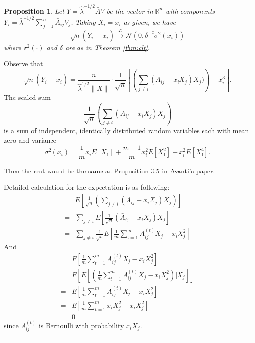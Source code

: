 \documentclass[a4paper]{article}
\newenvironment{proof}{{\bf Proof:  }}{\hfill\rule{2mm}{2mm}}
\newtheorem{proposition}[fact]{Proposition}
\begin{document}
\begin{proposition}
\label{prop:Y}
Let $Y = \hat{\lambda}^{-1/2} \bar{A} V$ be the vector in $\mathbb{R}^n$ with components $Y_i = \bar{\lambda}^{-1/2} \sum_{j=1}^n \bar{A}_{ij} V_j$.
Taking $X_i = x_i$ as given, we have
\[
	\sqrt{n}(Y_i - \frac{}{}x_i) \stackrel{\mathcal{L}}{\rightarrow} \mathcal{N}(0, \delta^{-2} \sigma^2(x_i))
\]
where $\sigma^2(\cdot)$ and $\delta$ are as in Theorem \ref{thm:clt}.
\end{proposition}
\begin{proof}
Observe that
\[
	\sqrt{n}(Y_i - \frac{}{}x_i) = \frac{n}{\hat{\lambda}^{1/2}\|X\|} \cdot \frac{1}{\sqrt{n}} \left[ \left( \sum_{j \ne i} (\bar{A}_{ij} - x_i X_j) X_j ) \right) - x_i^3 \right].
\]
The scaled sum
\[
 	\frac{1}{\sqrt{n}} \left( \sum_{j \ne i} (\bar{A}_{ij} - x_i X_j) X_j  \right)
\]
is a sum of independent, identically distributed random variables each with mean zero and variance
\[
	\sigma^2(x_i) = \frac{1}{m} x_i E[X_1] + \frac{m-1}{m} x_i^2 E[X_1^2] - x_i^2 E[X_1^4].
\]

Then the rest would be the same as Proposition 3.5 in Avanti's paper.

Detailed calculation for the expectation is as following:
\begin{align*}
	& E \left[\frac{1}{\sqrt{n}} \left( \sum_{j \ne i} (\bar{A}_{ij} - x_i X_j) X_j \right) \right] \\
    = & \sum_{j \ne i} E\left[\frac{1}{\sqrt{n}} (\bar{A}_{ij} - x_i X_j) X_j \right] \\
    = & \sum_{j \ne i} \frac{1}{\sqrt{n}} E\left[ \frac{1}{m} \sum_{t = 1}^m A^{(t)}_{ij} X_j - x_i X_j^2 \right]
\end{align*}
And
\begin{align*}
	& E\left[ \frac{1}{m} \sum_{t = 1}^m A^{(t)}_{ij} X_j - x_i X_j^2 \right] \\
    = & E\left[ E\left[ \left( \frac{1}{m} \sum_{t = 1}^m A^{(t)}_{ij} X_j - x_i X_j^2\right) | X_j \right] \right] \\
    = & E\left[ \frac{1}{m} \sum_{t = 1}^m A^{(t)}_{ij} X_j - x_i X_j^2 \right] \\
    = & E\left[  \frac{1}{m} \sum_{t = 1}^m x_i X_j^2 - x_i X_j^2 \right] \\
    = & 0
\end{align*}
since $A_{ij}^{(t)}$ is Bernoulli with probability $x_i X_j$.


\end{proof}
\end{document}
